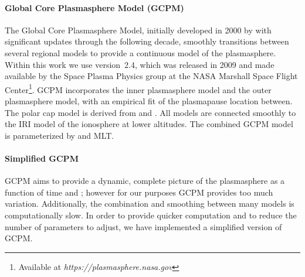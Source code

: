 \paragraph{Global Core Plasmasphere Model (GCPM)}
\label{section:gcpm}
The Global Core Plasmasphere Model, initially developed in 2000 by \cite{Gallagher1999} with significant updates through the following decade, smoothly transitions between several regional models to provide a continuous model of the plasmasphere. Within this work we use version~2.4, which was released in 2009 and made available by the Space Plasma Physics group at the NASA Marshall Space Flight Center\footnote{Available at \emph{https://plasmasphere.nasa.gov}}. GCPM incorporates the \cite{Carpenter1992} inner plasmasphere model and the \cite{Gallagher1995} outer plasmasphere model, with an empirical fit of the plasmapause location between. The polar cap model is derived from \cite{Persoon1983} and \cite{Chandler1991}. All models are connected smoothly to the IRI model of the ionosphere at lower altitudes. The combined GCPM model is parameterized by \kp{} and MLT.

\paragraph{Simplified GCPM}

GCPM aims to provide a dynamic, complete picture of the plasmasphere as a function of time and \kp{}; however for our purposes GCPM provides too much variation. Additionally, the combination and smoothing between many models is computationally slow. In order to provide quicker computation and to reduce the number of parameters to adjust, we have implemented a simplified version of GCPM.

